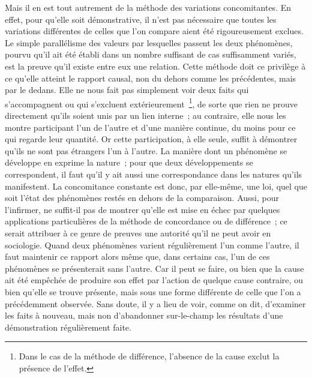 \documentclass[french,twoside]{book} %
\begin{document}
Mais il en est tout autrement de la méthode des variations concomitantes. En effet, pour qu’elle soit démonstrative, il n’est pas nécessaire que toutes les variations différentes de celles que l’on compare aient été rigoureusement exclues. Le simple parallélisme des valeurs par lesquelles passent les deux phénomènes, pourvu qu’il ait été établi dans un nombre suffisant de cas suffisamment variés, est la preuve qu’il existe entre eux une relation. Cette méthode doit ce privilège à ce qu’elle atteint le rapport causal, non du dehors comme les précédentes, mais par le dedans. Elle ne nous fait pas simplement voir deux faits qui s’accompagnent ou qui s’excluent extérieurement \footnote{ Dans le cas de la méthode de différence, l’absence de la cause exclut la présence de l’effet.}, de sorte que rien ne prouve directement qu’ils soient unis par un lien interne ; au contraire, elle nous les montre participant l’un de l’autre et d’une manière continue, du moins pour ce qui regarde leur quantité. Or cette participation, à elle seule, suffit à démontrer qu’ils ne sont pas étrangers l’un à l’autre. La manière dont un phénomène se développe en exprime la nature ; pour que deux développements se correspondent, il faut qu’il y ait aussi une correspondance dans les natures qu’ils manifestent. La concomitance constante est donc, par elle-même, une loi, quel que soit l’état des phénomènes restés en dehors de la comparaison. Aussi, pour l’infirmer, ne suffit-il pas de montrer qu’elle est mise en échec par quelques applications particulières de la méthode de concordance ou de différence ; ce serait attribuer à ce genre de preuves une autorité qu’il ne peut avoir en sociologie. Quand deux phénomènes varient régulièrement l’un comme l’autre, il faut maintenir ce rapport alors même que, dans certains cas, l’un de ces phénomènes se présenterait sans l’autre. Car il peut se faire, ou bien que la cause ait été empêchée de produire son effet par l’action de quelque cause contraire, ou bien qu’elle se trouve présente, mais sous une forme différente de celle que l’on a précédemment observée. Sans doute, il y a lieu de voir, comme on dit, d’examiner les faits à nouveau, mais non d’abandonner sur-le-champ les résultats d’une démonstration régulièrement faite.\par
\end{document}
